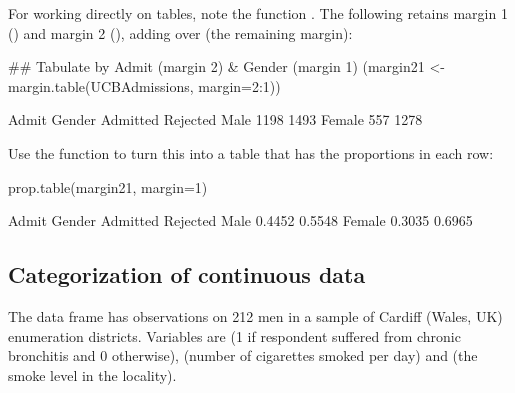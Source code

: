 For working directly on tables, note the function .
The following retains margin 1 () and margin 2 (),
adding over  (the remaining margin):
\begin{Schunk}
\begin{Sinput}
## Tabulate by Admit (margin 2) & Gender (margin 1)
(margin21 <- margin.table(UCBAdmissions,
                          margin=2:1))
\end{Sinput}
\begin{Soutput}
        Admit
Gender   Admitted Rejected
  Male       1198     1493
  Female      557     1278
\end{Soutput}
\end{Schunk}

Use the function  to turn this into a table
that has the proportions in each row:
\begin{Schunk}
\begin{Sinput}
prop.table(margin21, margin=1)
\end{Sinput}
\begin{Soutput}
        Admit
Gender   Admitted Rejected
  Male     0.4452   0.5548
  Female   0.3035   0.6965
\end{Soutput}
\end{Schunk}

\subsection{Categorization of continuous data}\label{ss:cat-cig}
The data frame 
has observations on 212 men in a sample of Cardiff (Wales, UK)
enumeration districts. Variables are  (1 if respondent
suffered from chronic bronchitis and 0 otherwise),  (number
of cigarettes smoked per day) and  (the smoke level in the
locality).

